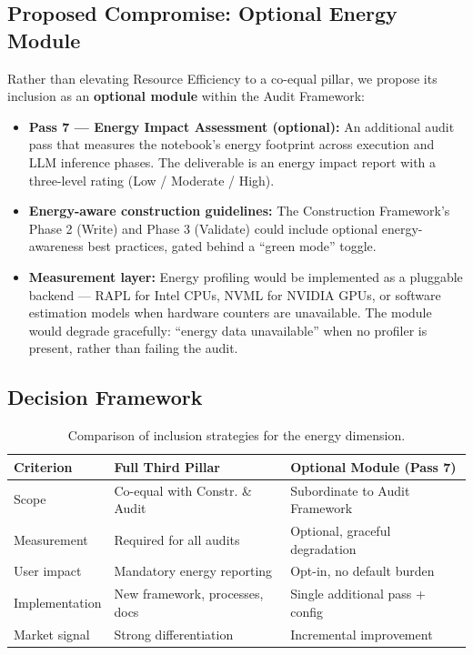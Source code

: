 \documentclass[11pt, a4paper]{article}
\begin{document}
\subsection*{Proposed Compromise: Optional Energy Module}

Rather than elevating Resource Efficiency to a co-equal pillar, we propose
its inclusion as an \textbf{optional module} within the Audit Framework:

\begin{itemize}
  \item \textbf{Pass 7 — Energy Impact Assessment (optional):} An additional
    audit pass that measures the notebook's energy footprint across execution
    and LLM inference phases. The deliverable is an energy impact report with
    a three-level rating (Low / Moderate / High).

  \item \textbf{Energy-aware construction guidelines:} The Construction
    Framework's Phase 2 (Write) and Phase 3 (Validate) could include optional
    energy-awareness best practices, gated behind a ``green mode'' toggle.

  \item \textbf{Measurement layer:} Energy profiling would be implemented as a
    pluggable backend — RAPL for Intel CPUs, NVML for NVIDIA GPUs, or
    software estimation models when hardware counters are unavailable. The
    module would degrade gracefully: ``energy data unavailable'' when no
    profiler is present, rather than failing the audit.
\end{itemize}

\subsection*{Decision Framework}

\begin{table}[H]
  \centering
  \caption{Comparison of inclusion strategies for the energy dimension.}
  \label{tab:energy-decision}
  \renewcommand{\arraystretch}{1.3}
  \begin{tabularx}{\textwidth}{l Y Y}
    \toprule
    \textbf{Criterion} & \textbf{Full Third Pillar} & \textbf{Optional Module
      (Pass 7)} \\
    \midrule
    Scope & Co-equal with Constr. \& Audit & Subordinate to Audit Framework \\
    Measurement & Required for all audits & Optional, graceful degradation \\
    User impact & Mandatory energy reporting & Opt-in, no default burden \\
    Implementation & New framework, processes, docs & Single additional pass
      + config \\
    Market signal & Strong differentiation & Incremental improvement \\
    \bottomrule
  \end{tabularx}
\end{table}
\end{document}

